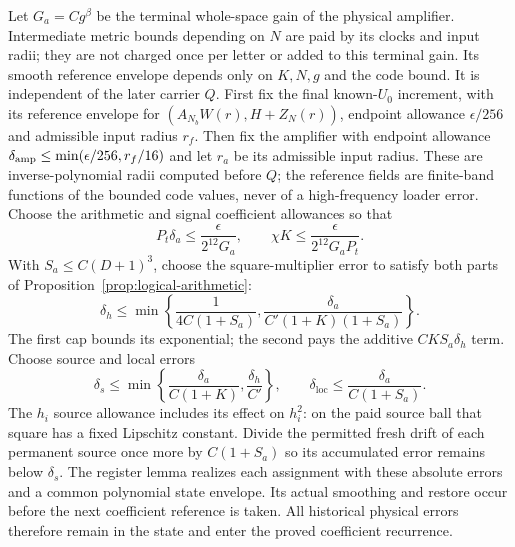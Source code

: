 \documentclass[11pt,a4paper]{amsart}
\theoremstyle{definition}
\theoremstyle{remark}
\numberwithin{equation}{section}
\begin{document}
Let $G_a=Cg^\beta$ be the terminal whole-space gain of the physical
amplifier. Intermediate metric bounds depending on $N$ are paid by its
clocks and input radii; they are not charged once per letter or added to
this terminal gain. Its smooth reference envelope depends only on
$K,N,g$ and the code bound. It is independent of the later carrier $Q$.
First fix the final known-$U_0$ increment, with its reference envelope
for $(A_{N_b}W(r),H+Z_N(r))$, endpoint allowance $\epsilon/256$ and
admissible input radius $r_f$. Then fix the amplifier with endpoint
allowance $\delta_{\rm amp}\le\min(\epsilon/256,r_f/16)$ and let $r_a$
be its admissible input radius. These are inverse-polynomial radii
computed before $Q$; the reference fields are finite-band functions of
the bounded code values, never of a high-frequency loader error.
Choose the arithmetic and signal coefficient allowances so that
\begin{equation}\label{eq:arithmetic-allocation}
 P_t\delta_a\le\frac{\epsilon}{2^{12}G_a},\qquad
 \chi K\le\frac{\epsilon}{2^{12}G_aP_t}.
\end{equation}
With $S_a\le C(D+1)^3$, choose the square-multiplier error to satisfy both
parts of Proposition~\ref{prop:logical-arithmetic}:
\[
 \delta_h\le\min\left\{\frac1{4C(1+S_a)},
              \frac{\delta_a}{C'(1+K)(1+S_a)}\right\}.
\]
The first cap bounds its exponential; the second pays the additive
$CKS_a\delta_h$ term. Choose source and local errors
\[
 \delta_s\le\min\left\{\frac{\delta_a}{C(1+K)},\frac{\delta_h}{C'}\right\},
 \qquad
 \delta_{\mathrm{loc}}\le\frac{\delta_a}{C(1+S_a)}.
\]
The $h_i$ source allowance includes its effect on $h_i^2$: on the paid
source ball that square has a fixed Lipschitz constant. Divide the permitted
fresh drift of each permanent source once more by $C(1+S_a)$ so its
accumulated error remains below $\delta_s$. The register lemma realizes
each assignment with these absolute errors and a common polynomial state
envelope. Its actual smoothing and restore occur before the next coefficient
reference is taken. All historical physical errors therefore remain in the
state and enter the proved coefficient recurrence.
\end{document}
